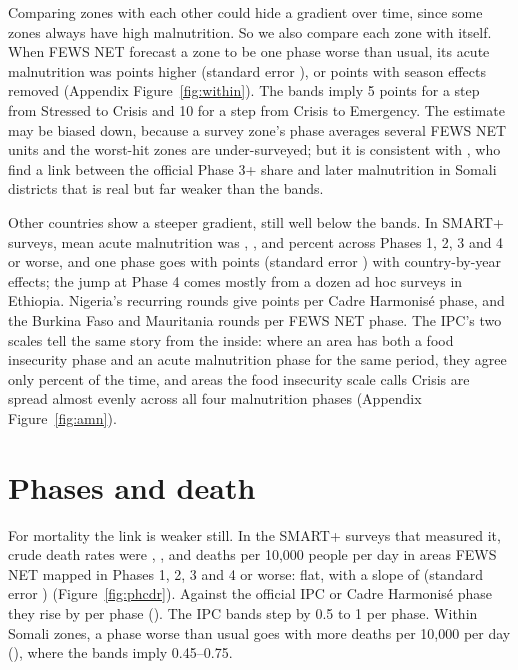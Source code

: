 \documentclass[11pt]{article}
\begin{document}
Comparing zones with each other could hide a gradient over time, since some zones always have high malnutrition. So we also compare each zone with itself. When FEWS NET forecast a zone to be one phase worse than usual, its acute malnutrition was \wzGamZone{} points higher (standard error \wzGamZoneSe{}), or \wzGamZoneSeason{} points with season effects removed (Appendix Figure~\ref{fig:within}). The bands imply 5 points for a step from Stressed to Crisis and 10 for a step from Crisis to Emergency. The estimate may be biased down, because a survey zone's phase averages several FEWS NET units and the worst-hit zones are under-surveyed; but it is consistent with \citet{reusken2025}, who find a link between the official Phase 3+ share and later malnutrition in Somali districts that is real but far weaker than the bands.

Other countries show a steeper gradient, still well below the bands. In SMART+ surveys, mean acute malnutrition was \spGamOne{}, \spGamTwo{}, \spGamThree{} and \spGamFour{} percent across Phases 1, 2, 3 and 4 or worse, and one phase goes with \spSlope{} points (standard error \spSlopeSe{}) with country-by-year effects; the jump at Phase 4 comes mostly from a dozen ad hoc surveys in Ethiopia. Nigeria's recurring rounds give \ngSlope{} points per Cadre Harmonis\'e phase, and the Burkina Faso and Mauritania rounds \fdwSlope{} per FEWS NET phase. The IPC's two scales tell the same story from the inside: where an area has both a food insecurity phase and an acute malnutrition phase for the same period, they agree only \amnAnyDiag{} percent of the time, and areas the food insecurity scale calls Crisis are spread almost evenly across all four malnutrition phases (Appendix Figure~\ref{fig:amn}).

\section{Phases and death}\label{sec:death}

For mortality the link is weaker still. In the SMART+ surveys that measured it, crude death rates were \spCdrOne{}, \spCdrTwo{}, \spCdrThree{} and \spCdrFour{} deaths per 10,000 people per day in areas FEWS NET mapped in Phases 1, 2, 3 and 4 or worse: flat, with a slope of \spCdrSlope{} (standard error \spCdrSlopeSe{}) (Figure~\ref{fig:phcdr}). Against the official IPC or Cadre Harmonis\'e phase they rise by \spCdrSlopeIpc{} per phase (\spCdrSlopeIpcSe{}). The IPC bands step by 0.5 to 1 per phase. Within Somali zones, a phase worse than usual goes with \wzCdrZone{} more deaths per 10,000 per day (\wzCdrZoneSe{}), where the bands imply 0.45--0.75.
\end{document}
